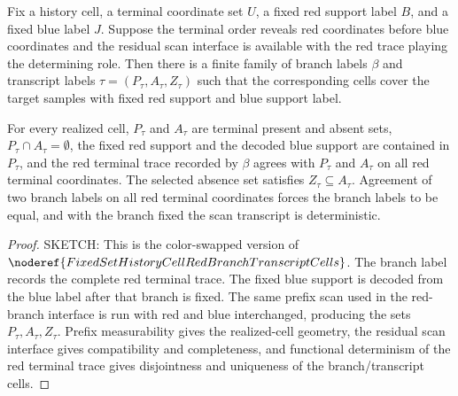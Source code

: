 \begin{helper}
Fix a history cell, a terminal coordinate set \(U\), a fixed red support
label \(B\), and a fixed blue label \(J\).  Suppose the terminal order reveals
red coordinates before blue coordinates and the residual scan interface is
available with the red trace playing the determining role.  Then there is a
finite family of branch labels \(\beta\) and transcript labels
\(\tau=(P_\tau,A_\tau,Z_\tau)\) such that the corresponding cells cover the
target samples with fixed red support and blue support label.

For every realized cell, \(P_\tau\) and \(A_\tau\) are terminal present and
absent sets, \(P_\tau\cap A_\tau=\emptyset\), the fixed red support and the
decoded blue support are contained in \(P_\tau\), and the red terminal trace
recorded by \(\beta\) agrees with \(P_\tau\) and \(A_\tau\) on all red
terminal coordinates.  The selected absence set satisfies
\(Z_\tau\subseteq A_\tau\).  Agreement of two branch labels on all red
terminal coordinates forces the branch labels to be equal, and with the
branch fixed the scan transcript is deterministic.
\end{helper}
\begin{proof}
SKETCH:
This is the color-swapped version of
\(\noderef{FixedSetHistoryCellRedBranchTranscriptCells}\).  The branch label
records the complete red terminal trace.  The fixed blue support is decoded
from the blue label after that branch is fixed.  The same prefix scan used in
the red-branch interface is run with red and blue interchanged, producing the
sets \(P_\tau,A_\tau,Z_\tau\).  Prefix measurability gives the realized-cell
geometry, the residual scan interface gives compatibility and completeness,
and functional determinism of the red terminal trace gives disjointness and
uniqueness of the branch/transcript cells.
\end{proof}
